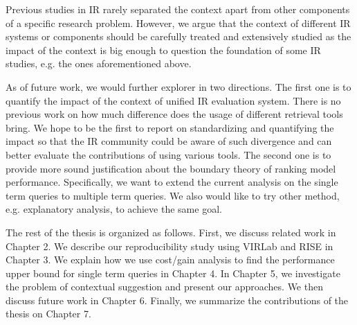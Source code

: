 Previous studies in IR rarely separated the context apart from other 
components of a specific research problem. However, we argue that the 
context of different IR systems or components should be carefully treated 
and extensively studied as the impact of the context is big enough to 
question the foundation of some IR studies, e.g. the ones aforementioned above.

As of future work, we would further explorer in two directions. 
The first one is to quantify the impact of the context of unified 
IR evaluation system. There is no previous work on how much difference does 
the usage of different retrieval tools bring.
We hope to be the first to report on standardizing and quantifying the 
impact so that the IR community could be aware of such divergence and can 
better evaluate the contributions of using various tools. 
The second one is to provide more sound justification about the boundary 
theory of ranking model performance. Specifically, we want to extend the 
current analysis on the single term queries to multiple term queries. 
We also would like to try other method, e.g. explanatory analysis, 
to achieve the same goal.

The rest of the thesis is organized as follows. First, we discuss related 
work in Chapter 2. We describe our reproducibility study using VIRLab and 
RISE in Chapter 3. We explain how we use cost/gain analysis to find the 
performance upper bound for single term queries in Chapter 4. 
In Chapter 5, we investigate the problem of contextual suggestion and 
present our approaches. We then discuss future work in Chapter 6. 
Finally, we summarize the contributions of the thesis on Chapter 7.
